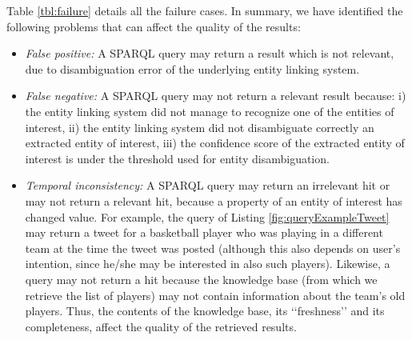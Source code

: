 \documentclass[twocolumn]{svjour3}
\newcommand{\q}[1]{\lq\lq{}{}#1\rq\rq{}{}}
\begin{document}
Table \ref{tbl:failure} details all the failure cases.
In summary, we have identified the following problems
that can affect the quality of the results:

\begin{itemize}
\item
{\em False positive:} A SPARQL query may return a
result which is not relevant, due to disambiguation error
of the underlying entity linking system.

\item
{\em False negative:} A SPARQL query may not return a relevant result because:
i) the entity linking system did not manage to recognize one of the entities of interest,
ii) the entity linking system did not disambiguate correctly
an extracted entity of interest,
iii) the confidence score of the extracted entity of interest
is under the threshold used for entity disambiguation.

\item
{\em Temporal inconsistency:}
A SPARQL query may return an irrelevant hit
or may not return a relevant hit,
because a property of an entity of interest has changed value.
For example,
the query of Listing \ref{fig:queryExampleTweet}
may return a tweet for a basketball player who was playing
in a different team at the time the tweet was posted
(although this also depends on user's intention, since
he/she may be interested in also such players).
Likewise, a query may not return a hit because
the knowledge base (from which we retrieve the list of players)
may not contain information about the team's old players.
Thus, the contents of the knowledge base, its \q{freshness}
and its completeness, affect the quality
of the retrieved results.
\end{itemize}
\end{document}
